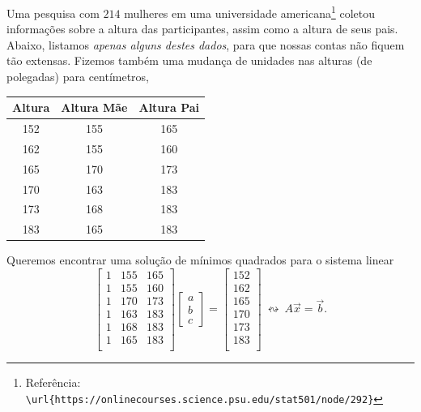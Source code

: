 \begin{ex}
  Uma pesquisa com $214$ mulheres em uma universidade americana\footnote{Referência: \verb"\url{https://onlinecourses.science.psu.edu/stat501/node/292}"} coletou informações sobre a altura das participantes, assim como a altura de seus pais. Abaixo, listamos \textit{apenas alguns destes dados}, para que nossas contas não fiquem tão extensas. Fizemos também uma mudança de unidades nas alturas (de polegadas) para centímetros,
  \begin{center}
    \begin{tabular}{|c|c|c|}
      \hline
      Altura & Altura Mãe & Altura Pai \\ \hline
      152 & 155 & 165 \\
      162 & 155 & 160 \\
      165 & 170 & 173 \\
      170 & 163 & 183 \\
      173 & 168 & 183 \\
      183 & 165 & 183 \\
      \hline
    \end{tabular}
  \end{center} Queremos encontrar uma solução de mínimos quadrados para o sistema linear
  \begin{equation}
  \begin{bmatrix}
    1 & 155 & 165 \\
    1 & 155 & 160 \\
    1 & 170 & 173 \\
    1 & 163 & 183 \\
    1 & 168 & 183 \\
    1 & 165 & 183 \\
  \end{bmatrix}
  \begin{bmatrix}
    a \\ b \\ c
  \end{bmatrix} =
  \begin{bmatrix}
    152  \\
    162  \\
    165  \\
    170  \\
    173  \\
    183  \\
  \end{bmatrix} \ \leftrightsquigarrow \ A \vec{x} = \vec{b}.

\end{equation}
\end{ex}
